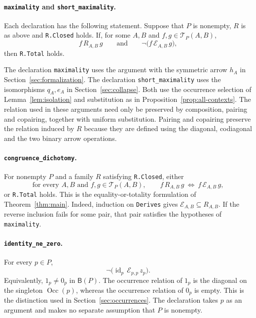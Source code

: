 \documentclass[11pt]{article}
\newcommand{\B}{\mathsf B}
\newcommand{\Occ}{\operatorname{Occ}}
\begin{document}
\paragraph{\texttt{maximality} and \texttt{short\_maximality}.}
Each declaration has the following statement. Suppose that $P$ is
nonempty, $R$ is as above and \texttt{R.Closed} holds. If, for some
$A,B$ and $f,g\in\mathcal T_P(A,B)$,
\[
 f\,R_{A,B}\,g
 \qquad\text{and}\qquad
 \neg\bigl(f\,\mathcal E_{A,B}\,g\bigr),
\]
then \texttt{R.Total} holds.

The declaration \texttt{maximality} uses the argument with the
symmetric arrow $h_A$ in Section~\ref{sec:formalization}.
The declaration \texttt{short\_maximality} uses the isomorphisms
$q_A,e_A$ in Section~\ref{sec:collapse}.
Both use the occurrence selection of Lemma~\ref{lem:isolation}
and substitution as in Proposition~\ref{prop:all-contexts}.
The relation used in these arguments need only be preserved by
composition, pairing and copairing, together with uniform substitution.
Pairing and copairing preserve the relation induced by $R$ because
they are defined using the diagonal, codiagonal and the two binary
arrow operations.

\paragraph{\texttt{congruence\_dichotomy}.}
For nonempty $P$ and a family $R$ satisfying \texttt{R.Closed},
either
\[
 \text{for every }A,B\text{ and }f,g\in\mathcal T_P(A,B),\qquad
 f\,R_{A,B}\,g\ \Longleftrightarrow\ f\,\mathcal E_{A,B}\,g,
\]
or \texttt{R.Total} holds. This is the equality-or-totality formulation
of Theorem~\ref{thm:main}.
Indeed, induction on \texttt{Derives} gives $\mathcal E_{A,B}\subseteq
R_{A,B}$. If the reverse inclusion fails for some pair, that pair
satisfies the hypotheses of \texttt{maximality}.

\paragraph{\texttt{identity\_ne\_zero}.}
For every $p\in P$,
\[
 \neg\bigl(\operatorname{id}_p\,\mathcal E_{p,p}\,z_p\bigr).
\]
Equivalently, $1_p\ne0_p$ in $\B(P)$.
The occurrence relation of $1_p$ is the diagonal on the singleton
$\Occ(p)$, whereas the occurrence relation of $0_p$ is empty.
This is the distinction used in Section~\ref{sec:occurrences}.
The declaration takes $p$ as an argument and makes no separate
assumption that $P$ is nonempty.
\end{document}
